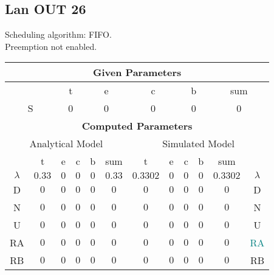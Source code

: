 \documentclass{article}
\begin{document}
\subsection{Lan OUT 26}
Scheduling algorithm: FIFO.\\Preemption not enabled. \\\begin{table}[H]\centering\begin{tabular}{@{}c|cccc|c||cccc|c|c@{}}\toprule\multicolumn{12}{c}{\textbf{Given Parameters}}\\\midrule\multicolumn{2}{c|}{ } & \multicolumn{2}{c}{t} & \multicolumn{2}{c}{e} & \multicolumn{2}{c}{c} & \multicolumn{2}{c}{b} & \multicolumn{2}{|c}{sum} \\ \midrule\multicolumn{2}{c|}{S} & \multicolumn{2}{c}{0} & \multicolumn{2}{c}{0} & \multicolumn{2}{c}{0} & \multicolumn{2}{c}{0} & \multicolumn{2}{|c}{0}\\ \midrule\midrule\multicolumn{12}{c}{\textbf{Computed Parameters}}\\ \midrule\multicolumn{6}{c||}{Analytical Model} & \multicolumn{6}{c}{Simulated Model}\\ 
 \midrule & t & e & c & b & sum & t & e & c & b & sum &  \\ \midrule$\lambda$ &$0.33$ & $0$ & $0$ & $0$ & $0.33$ & $0.3302$ & $0$ & $0$ & $0$ & $0.3302$& $\lambda$ \\D & $0$ & $0$ & $0$ & $0$ & $0$ & $0$ & $0$ & $0$ & $0$ & $0$& D\\N & $0$ & $0$ & $0$ & $0$ & $0$ & $0$ & $0$ & $0$ & $0$ & $0$& N\\U & $0$ & $0$ & $0$ & $0$ & $0$ & $0$ & $0$ & $0$ & $0$ & $0$& U\\RA & $0$ & $0$ & $0$ & $0$ & $0$ & $0$ & $0$ & $0$ & $0$ & $0$& \textcolor{teal}{RA}\\RB & $0$ & $0$ & $0$ & $0$ & $0$ & $0$ & $0$ & $0$ & $0$ & $0$& RB\\
\bottomrule
\end{tabular}
\end{table}
\filbreak
\end{document}
